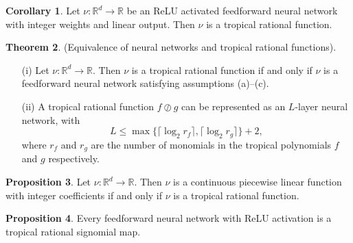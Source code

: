 \documentclass{article}
\theoremstyle{definition}
\newtheorem{theorem}{Theorem}[section]
\newtheorem{corollary}[theorem]{Corollary}
\newtheorem{proposition}[theorem]{Proposition}
\newtheorem{comment}[theorem]{Comment}
\begin{document}
\begin{corollary}
Let $\nu : \mathbb{R}^{d} \to \mathbb{R}$ be an ReLU activated feedforward neural network with integer weights and linear output. Then $\nu$ is a tropical rational function.
\end{corollary}

\begin{theorem}
(Equivalence of neural networks and tropical
rational functions).
\begin{itemize}
\item[(i)]
Let $\nu : \mathbb{R}^{d} \to \mathbb{R}$. Then $\nu$ is a tropical rational function if and only if $\nu$ is a feedforward neural network satisfying assumptions (a)–(c).
\item[(ii)]
A tropical rational function $f \oslash g$ can be represented as an $L$-layer neural network, with
$$ L \leq \max \{ \lceil \log_2 r_f \rceil, \lceil \log_2 r_g \rceil \} + 2,$$
where $r_f$ and $r_g$ are the number of monomials in the tropical polynomials $f$ and $g$ respectively.
\end{itemize}
\end{theorem}

\begin{proposition}
Let $\nu : \mathbb{R}^{d} \to \mathbb{R}$. Then $\nu$ is a continuous piecewise linear function with integer coefficients if and only if $\nu$ is a tropical rational function.
\end{proposition}

\begin{proposition}
Every feedforward neural network with ReLU activation is a tropical rational signomial map.
\end{proposition}
\newpage



\end{document}
